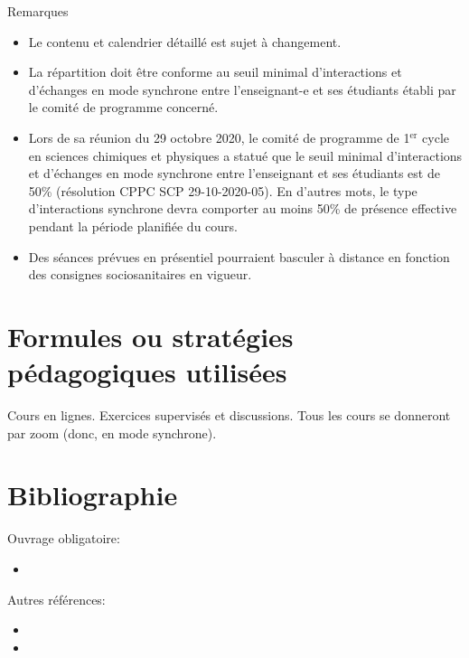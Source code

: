 \documentclass[12pt,undergraduate]{uqtrplandecours}
\begin{document}
\bigskip
\noindent
Remarques
\begin{itemize}
  \item Le contenu et calendrier détaillé est sujet à changement.
  \item La répartition doit être conforme au seuil minimal d’interactions et d’échanges en mode synchrone
        entre l’enseignant-e et ses étudiants établi par le comité de programme concerné.
  \item Lors de sa réunion du 29 octobre 2020, le comité de programme de 1$^{\text{er}}$ cycle en sciences chimiques et physiques
        a statué que le seuil minimal d’interactions et d’échanges en mode synchrone
        entre l’enseignant et ses étudiants est de 50\% (résolution CPPC SCP 29-10-2020-05).
        En d’autres mots, le type d’interactions synchrone devra comporter au moins 50\%
        de présence effective pendant la période planifiée du cours.
  \item Des séances prévues en présentiel pourraient basculer à distance en fonction des consignes sociosanitaires en vigueur.
\end{itemize}

\FloatBarrier


\clearpage
\section{Formules ou stratégies pédagogiques utilisées}

Cours en lignes. Exercices supervisés et discussions.
Tous les cours se donneront par zoom (donc, en mode synchrone).

\section{Bibliographie}

Ouvrage obligatoire:
\begin{itemize}
  \item {}
\end{itemize}

Autres références:
\begin{itemize}
  \item {}
  \item {}
\end{itemize}
\end{document}
